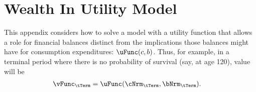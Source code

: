 \documentclass[./SolvingMicroDSOPs_TRP]{subfiles}
\begin{document}
\section{Wealth In Utility Model}


\newcommand{\cdc}{\ifthenelse{\boolean{CDC}}}

\newcommand{\wealthU}{\delta}
\newcommand{\uFromC}{\acute{\uFunc}}
\newcommand{\uFromB}{\grave{\uFunc}}
\newcommand{\muInvVect}{[{\mu}^{-1}_{\tCurr}]}
\newcommand{\Rend}{\tilde}

\newcommand{\beginWithb}{0\epsilon}
\newcommand{\receiveinc}{1\epsilon}
\newcommand{\calculatem}{2\epsilon}
\newcommand{\choosecons}{3\epsilon}
\newcommand{\calculatea}{4\epsilon}
\newcommand{\chooserisk}{5\epsilon}
\newcommand{\definevEnd}{6\epsilon}
\newcommand{\drawreturn}{2\epsilon}
\newcommand{\calculatee}{1\epsilon}
\newcommand{\Maxed}{\accentset{*}}


This appendix considers how to solve a model with a utility function that allows a role for financial balances distinct from the implications those balances might have for consumption expenditures: $\uFunc(c,b)$.  Thus, for example, in a terminal period where there is no probability of survival (say, at age 120), value will be 
\begin{align}
  \vFunc_{\tTerm} & = \uFunc(\cNrm_{\tTerm},\bNrm_{\tTerm}).
\end{align}
\end{document}
